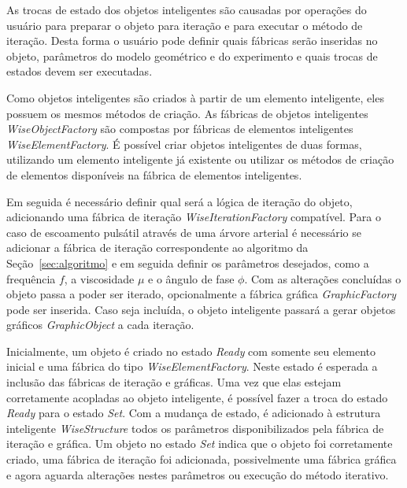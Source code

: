 \documentclass[a4paper,12pt]{monografia}
\theoremstyle{plain}
\theoremstyle{definition}
\theoremstyle{remark}
\begin{document}
As trocas de estado dos objetos inteligentes são causadas por operações do usuário para preparar o objeto para iteração e para executar o método de iteração. Desta forma o usuário pode definir quais fábricas serão inseridas no objeto, parâmetros do modelo geométrico e do experimento e quais trocas de estados devem ser executadas.

Como objetos inteligentes são criados à partir de um elemento inteligente, eles possuem os mesmos métodos de criação. As fábricas de objetos inteligentes \textit{WiseObjectFactory} são compostas por fábricas de elementos inteligentes \textit{WiseElementFactory}. É possível criar objetos inteligentes de duas formas, utilizando um elemento inteligente já existente ou utilizar os métodos de criação de elementos disponíveis na fábrica de elementos inteligentes.

Em seguida é necessário definir qual será a lógica de iteração do objeto, adicionando uma fábrica de iteração \textit{WiseIterationFactory} compatível. Para o caso de escoamento pulsátil através de uma árvore arterial é necessário se adicionar a fábrica de iteração correspondente ao algoritmo da Seção~\ref{sec:algoritmo} e em seguida definir os parâmetros desejados, como a frequência $f$, a viscosidade $\mu$ e o ângulo de fase $\phi$. Com as alterações concluídas o objeto passa a poder ser iterado, opcionalmente a fábrica gráfica \textit{GraphicFactory} pode ser inserida. Caso seja incluída, o objeto inteligente passará a gerar objetos gráficos \textit{GraphicObject} a cada iteração.

Inicialmente, um objeto é criado no estado \textit{Ready} com somente seu elemento inicial e uma fábrica do tipo \textit{WiseElementFactory}. Neste estado é esperada a inclusão das fábricas de iteração e gráficas. Uma vez que elas estejam corretamente acopladas ao objeto inteligente, é possível fazer a troca do estado \textit{Ready} para o estado \textit{Set}. Com a mudança de estado, é adicionado à estrutura inteligente \textit{WiseStructure} todos os parâmetros disponibilizados pela fábrica de iteração e gráfica. Um objeto no estado \textit{Set} indica que o objeto foi corretamente criado, uma fábrica de iteração foi adicionada, possivelmente uma fábrica gráfica e agora aguarda alterações nestes parâmetros ou execução do método iterativo.
\end{document}
